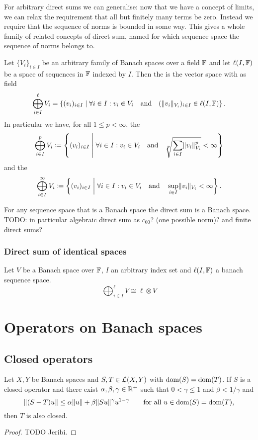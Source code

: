 For arbitrary direct sums we can generalise: now that we have a concept of limits, we can relax the requirement that all but finitely many terms be zero. Instead we require that the sequence of norms is bounded in some way. This gives a whole family of related concepts of direct sum, named for which sequence space the sequence of norms belongs to.
\begin{definition}
Let $\{V_i\}_{i\in I}$ be an arbitrary family of Banach spaces over a field $\mathbb{F}$ and let $\ell(I,\mathbb{F})$ be a space of sequences in $\mathbb{F}$ indexed by $I$. Then the  is the vector space with as field
\[ \bigoplus_{i\in I}^\ell V_i = \left\{ (v_i)_{i\in I} \;\middle|\; \forall i\in I: v_i\in V_i \quad\text{and}\quad (\lVert v_i\rVert_{V_i})_{i\in I}\in \ell(I,\mathbb{F})  \right\}. \]
In particular we have, for all $1\leq p<\infty$, the 
\[ \bigoplus_{i\in I}^p V_i \coloneqq \left\{ (v_i)_{i\in I} \;\middle|\; \forall i\in I: v_i\in V_i \quad\text{and}\quad \sqrt[p]{\sum_{i\in I}\lVert v_i\rVert_{V_i}^p}<\infty \right\} \]
and the 
\[ \bigoplus_{i\in I}^\infty V_i \coloneqq \left\{ (v_i)_{i\in I} \;\middle|\; \forall i\in I: v_i\in V_i \quad\text{and}\quad \sup_{i\in I}\lVert v_i\rVert_{V_i}<\infty \right\}. \]
\end{definition}

\begin{proposition}
For any sequence space that is a Banach space the direct sum is a Banach space. TODO: in particular algebraic direct sum as $c_{00}$? (one possible norm)? and finite direct sums?
\end{proposition}

\subsubsection{Direct sum of identical spaces}
\begin{proposition}
Let $V$ be a Banach space over $\mathbb{F}$, $I$ an arbitrary index set and $\ell(I,\mathbb{F})$ a banach sequence space.
\[ \bigoplus_{i\in I}^\ell V \cong \ell\otimes V \]
\end{proposition}


\section{Operators on Banach spaces}
\subsection{Closed operators}
\begin{proposition}
Let $X,Y$ be Banach spaces and $S,T\in \operatorname{\mathcal{L}}(X,Y)$ with $\operatorname{dom}(S) = \operatorname{dom}(T)$. If $S$ is a closed operator and there exist $\alpha,\beta,\gamma\in \mathbb{R}^+$ such that $0 < \gamma \leq 1$ and $\beta < 1/\gamma$ and
\[ \lVert(S-T)u\rVert \leq \alpha \lVert u\rVert + \beta\lVert Su\rVert^\gamma{u}^{1-\gamma} \qquad\text{for all $u\in \operatorname{dom}(S) = \operatorname{dom}(T)$,} \]
then $T$ is also closed.
\end{proposition}
\begin{proof}
TODO Jeribi.
\end{proof}

